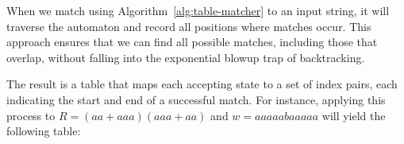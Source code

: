 
When we match using Algorithm~\ref{alg:table-matcher} to an input string, it will traverse the automaton and record all positions where matches occur. This approach ensures that we can find all possible matches, including those that overlap, without falling into the exponential blowup trap of backtracking.

The result is a table that maps each accepting state to a set of index pairs, each indicating the start and end of a successful match. For instance, applying this process to $R = (aa+aaa)(aaa+aa)$ and $w = aaaaabaaaaa$ will yield the following table:

\begin{table}[H]
	\caption{Match positions table using the regular expression $R = (aa+aaa)(aaa+aa)$ and input string $w = aaaaabaaaaa$}
	\centering
\end{table}
